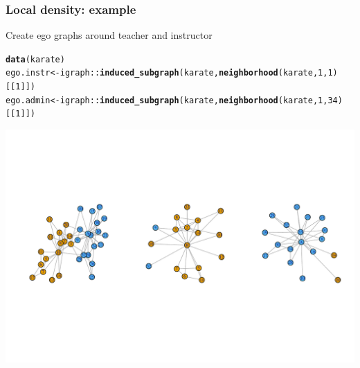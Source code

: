 \documentclass{beamer}\usepackage[]{graphicx}\usepackage[]{color}
\makeatletter
\newcommand{\hlnum}[1]{\textcolor[rgb]{0.686,0.059,0.569}{#1}}%
\newcommand{\hlopt}[1]{\textcolor[rgb]{0,0,0}{#1}}%
\newcommand{\hlstd}[1]{\textcolor[rgb]{0.345,0.345,0.345}{#1}}%
\newcommand{\hlkwb}[1]{\textcolor[rgb]{0.69,0.353,0.396}{#1}}%
\newcommand{\hlkwd}[1]{\textcolor[rgb]{0.737,0.353,0.396}{\textbf{#1}}}%
\newenvironment{kframe}{%
 \def\at@end@of@kframe{}%
 \ifinner\ifhmode%
  \def\at@end@of@kframe{\end{minipage}}%
  \begin{minipage}{\columnwidth}%
 \fi\fi%
 \def\FrameCommand##1{\hskip\@totalleftmargin \hskip-\fboxsep
 \colorbox{shadecolor}{##1}\hskip-\fboxsep
     \hskip-\linewidth \hskip-\@totalleftmargin \hskip\columnwidth}%
 \MakeFramed {\advance\hsize-\width
   \@totalleftmargin\z@ \linewidth\hsize
   \@setminipage}}%
 {\par\unskip\endMakeFramed%
 \at@end@of@kframe}
\newenvironment{knitrout}{}{} %
\makeatother
\begin{document}
\begin{frame}[fragile]
  \frametitle{Local density: example}



Create ego graphs around teacher and instructor
\begin{knitrout}\scriptsize
{}\color{fgcolor}\begin{kframe}
\begin{alltt}
\hlkwd{data}\hlstd{(karate)}
\hlstd{ego.instr} \hlkwb{<-} \hlstd{igraph}\hlopt{::}\hlkwd{induced_subgraph}\hlstd{(karate,} \hlkwd{neighborhood}\hlstd{(karate,} \hlnum{1}\hlstd{,} \hlnum{1}\hlstd{)[[}\hlnum{1}\hlstd{]])}
\hlstd{ego.admin} \hlkwb{<-} \hlstd{igraph}\hlopt{::}\hlkwd{induced_subgraph}\hlstd{(karate,} \hlkwd{neighborhood}\hlstd{(karate,} \hlnum{1}\hlstd{,} \hlnum{34}\hlstd{)[[}\hlnum{1}\hlstd{]])}
\end{alltt}
\end{kframe}
\end{knitrout}

\begin{knitrout}\scriptsize
{}\color{fgcolor}
\includegraphics[width=.8\textwidth]{figures/density3-1} 

\end{knitrout}

\end{frame}
\end{document}
